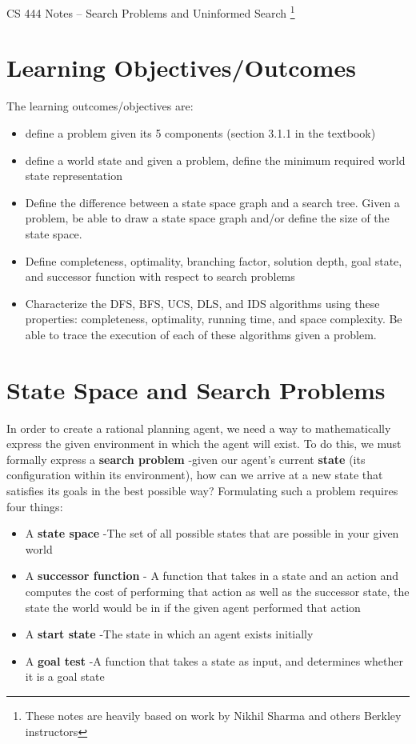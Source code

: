 \documentclass{article}[letterpaper]
\begin{document}
{\huge CS 444 Notes -- Search Problems and Uninformed Search \footnote{These notes are heavily based on work by Nikhil Sharma and
others Berkley instructors}}



\section*{Learning Objectives/Outcomes}
The learning outcomes/objectives are:
\begin{itemize}
\item define a problem given its 5 components (section 3.1.1 in the textbook)
\item define a world state and given a problem, define the minimum required world state representation
\item Define the difference between a state space graph and a search tree.  Given a problem, be able to draw a
state space graph and/or define the size of the state space.
\item Define completeness, optimality, branching factor, solution depth, goal state, and successor function with respect to search problems
\item Characterize the DFS, BFS, UCS, DLS, and IDS algorithms using these properties: completeness, optimality, running time, and space
complexity.  Be able to trace the execution of each of these algorithms given a problem.
\end{itemize}


\section*{State Space and Search Problems}
In order to create a rational planning agent, we need a way to mathematically express the given environment in which the agent will exist. To do this, we must formally express a \textbf{search problem} -given our agent’s current \textbf{state} (its configuration within its environment), how can we arrive at a new state that satisfies its goals in the best possible way? Formulating such a problem requires four things: 
\begin{itemize}
\item A \textbf{state space} -The set of all possible states that are possible in your given world 
\item A \textbf{successor function} - A function that takes in a state and an action and computes the cost of performing that action as well as the successor state, the state the world would be in if the given agent performed that action
\item A \textbf{start state} -The state in which an agent exists initially
\item A \textbf{goal test} -A function that takes a state as input, and determines whether it is a goal state

\end{itemize}
\end{document}
